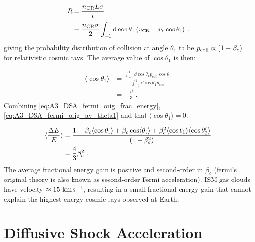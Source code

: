 \begin{equation}
    \begin{aligned}
        R&=\frac{n_\text{CR}L\sigma}{t} \\
        &=\frac{n_\text{CR}\sigma}{2}\int_{-1}^1\dd{\cos\theta_1}\qty(v_\text{CR}-v_c\cos\theta_1) \text{ .}
    \end{aligned}
\end{equation}
\noindent giving the probability distribution of collision at angle $\theta_1$ to be $p_\text{coll}\propto \qty(1-\beta_c)$ for relativistic cosmic rays. The average value of $\cos\theta_1$ is then:

\begin{equation}
    \begin{aligned}
        \langle \cos\theta_1\rangle &=\frac{\int_{-1}^1\dd{\cos\theta_1}p_\text{coll}\cos\theta_1}{\int_{-1}^1\dd{\cos\theta_1}p_\text{coll}} \\
        &=-\frac{\beta}{3} \text{ .}
    \end{aligned} \label{eq:A3_DSA_fermi_orig_av_theta1}
\end{equation} 
\noindent Combining \autoref{eq:A3_DSA_fermi_orig_frac_energy}, \autoref{eq:A3_DSA_fermi_orig_av_theta1} and that $\langle \cos\theta_1 \rangle=0$:

\begin{equation}
    \begin{aligned}
        \langle \frac{\Delta E}{E} \rangle&=\frac{1-\beta_c\langle\cos\theta_1\rangle+\beta_c\cos\langle\theta_1\rangle+\beta_c^2\langle\cos\theta_1\rangle\langle\cos\theta_2'\rangle}{\qty(1-\beta_c^2)} \\
        &= \frac{4}{3}\beta_c^2 \text{ .}
    \end{aligned}
\end{equation}
\noindent The average fractional energy gain is positive and second-order in $\beta_c$ (fermi's original theory is also known as second-order Fermi acceleration). ISM gas clouds have velocity $\approx 15~\si{\kilo\meter\per\second}$, resulting in a small fractional energy gain that cannot explain the highest energy cosmic rays observed at Earth. \citep{1949PhRv...75.1169F}. 

\section{Diffusive Shock Acceleration}

